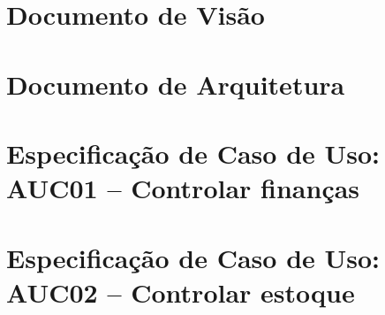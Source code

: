 \begin{anexosenv}
\partanexos
\chapter{Documento de Visão} \label{doc:visao}


\chapter{Documento de Arquitetura} \label{doc:arq}


\chapter{Especificação de Caso de Uso: AUC01 -- Controlar finanças} \label{doc:auc01}


\chapter{Especificação de Caso de Uso: AUC02 -- Controlar estoque} \label{doc:auc02}


\end{anexosenv}
